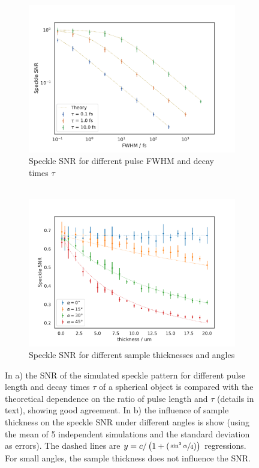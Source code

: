 \begin{figure}
	\centering
	\begin{subfigure}[t]{0.45\textwidth}
		\includegraphics[width=\linewidth]{images/timedependent_1.pdf}
		\caption{Speckle SNR for different pulse FWHM and decay times $\tau$\\$ $}
	\end{subfigure}
	\hspace{0.1cm}
	\begin{subfigure}[t]{0.45\textwidth}
		\includegraphics[width=\linewidth]{images/thickness.pdf}
		\caption{Speckle SNR for different sample thicknesses and angles}
	\end{subfigure}
	\caption[Speckle SNR in Time Dependent Simulation]{ In a) the SNR of the simulated speckle pattern for different pulse length and decay times $\tau$ of a spherical object is compared with the theoretical dependence on the ratio of pulse length and $\tau$ (details in text), showing good agreement. In b) the influence of sample thickness on the speckle SNR under different angles is show (using the mean of 5 independent simulations and the standard deviation as errors). The dashed lines are $y=c/\left(1+(\sfrac{\sin^2 \alpha}{4})\right)$ regressions. For small angles, the sample thickness does not influence the SNR.}
\end{figure}

